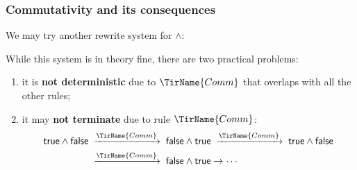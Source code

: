 \documentclass[compress,dvipdfmx]{beamer}
\newcommand{\true}{\textsf{true}\xspace}
\newcommand{\false}{\textsf{false}\xspace}
\begin{document}
%
\begin{frame}
  \frametitle{Commutativity and its consequences}

  We may try another rewrite system for \(\wedge\):
  While this system is in theory fine, there are two practical
  problems:
  \begin{enumerate}

    \item it is \textbf{not deterministic} due to \(\TirName{Comm}\)
      that overlaps with all the other rules;

    \item it may \textbf{not terminate} due to rule
      \(\TirName{Comm}\):
      \begin{align*}
        \true \wedge \false
        & \;\xrightarrow{\TirName{Comm}}\;
        \false \wedge \true \;\xrightarrow{\TirName{Comm}}\; \true
        \wedge \false\\
        & \;\xrightarrow{\TirName{Comm}}\; \false
        \wedge \true \rightarrow \cdots
      \end{align*}

  \end{enumerate}

\end{frame}
\end{document}
